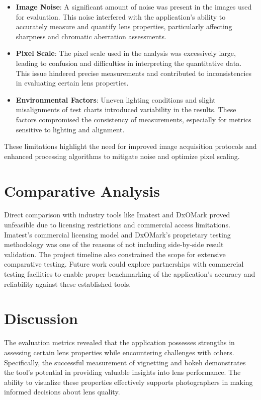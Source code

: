 \begin{itemize}
    \item \textbf{Image Noise}: A significant amount of noise was present in the images used for evaluation. This noise interfered with the application's ability to accurately measure and quantify lens properties, particularly affecting sharpness and chromatic aberration assessments.
    \item \textbf{Pixel Scale}: The pixel scale used in the analysis was excessively large, leading to confusion and difficulties in interpreting the quantitative data. This issue hindered precise measurements and contributed to inconsistencies in evaluating certain lens properties.
    \item \textbf{Environmental Factors}: Uneven lighting conditions and slight misalignments of test charts introduced variability in the results. These factors compromised the consistency of measurements, especially for metrics sensitive to lighting and alignment.
\end{itemize}

These limitations highlight the need for improved image acquisition protocols and enhanced processing algorithms to mitigate noise and optimize pixel scaling.

\section{Comparative Analysis}
Direct comparison with industry tools like Imatest and DxOMark proved unfeasible due to licensing restrictions and commercial access limitations. Imatest's commercial licensing model and DxOMark's proprietary testing methodology was one of the reasons of not including side-by-side result validation. The project timeline also constrained the scope for extensive comparative testing. Future work could explore partnerships with commercial testing facilities to enable proper benchmarking of the application's accuracy and reliability against these established tools.

\section{Discussion}
The evaluation metrics revealed that the application possesses strengths in assessing certain lens properties while encountering challenges with others. Specifically, the successful measurement of vignetting and bokeh demonstrates the tool's potential in providing valuable insights into lens performance. The ability to visualize these properties effectively supports photographers in making informed decisions about lens quality.


